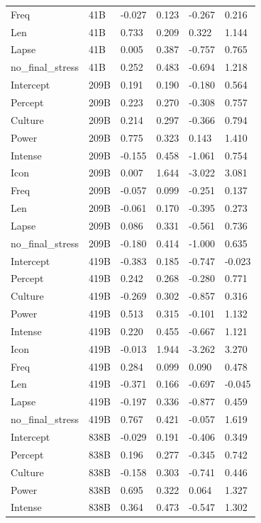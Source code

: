 \documentclass[
  nottoc]{article}
\begin{document}
\begin{longtable}[]{@{}llllll@{}}
Freq & 41B & -0.027 & 0.123 & -0.267 & 0.216 \\
Len & 41B & 0.733 & 0.209 & 0.322 & 1.144 \\
Lapse & 41B & 0.005 & 0.387 & -0.757 & 0.765 \\
no\_final\_stress & 41B & 0.252 & 0.483 & -0.694 & 1.218 \\
Intercept & 209B & 0.191 & 0.190 & -0.180 & 0.564 \\
Percept & 209B & 0.223 & 0.270 & -0.308 & 0.757 \\
Culture & 209B & 0.214 & 0.297 & -0.366 & 0.794 \\
Power & 209B & 0.775 & 0.323 & 0.143 & 1.410 \\
Intense & 209B & -0.155 & 0.458 & -1.061 & 0.754 \\
Icon & 209B & 0.007 & 1.644 & -3.022 & 3.081 \\
Freq & 209B & -0.057 & 0.099 & -0.251 & 0.137 \\
Len & 209B & -0.061 & 0.170 & -0.395 & 0.273 \\
Lapse & 209B & 0.086 & 0.331 & -0.561 & 0.736 \\
no\_final\_stress & 209B & -0.180 & 0.414 & -1.000 & 0.635 \\
Intercept & 419B & -0.383 & 0.185 & -0.747 & -0.023 \\
Percept & 419B & 0.242 & 0.268 & -0.280 & 0.771 \\
Culture & 419B & -0.269 & 0.302 & -0.857 & 0.316 \\
Power & 419B & 0.513 & 0.315 & -0.101 & 1.132 \\
Intense & 419B & 0.220 & 0.455 & -0.667 & 1.121 \\
Icon & 419B & -0.013 & 1.944 & -3.262 & 3.270 \\
Freq & 419B & 0.284 & 0.099 & 0.090 & 0.478 \\
Len & 419B & -0.371 & 0.166 & -0.697 & -0.045 \\
Lapse & 419B & -0.197 & 0.336 & -0.877 & 0.459 \\
no\_final\_stress & 419B & 0.767 & 0.421 & -0.057 & 1.619 \\
Intercept & 838B & -0.029 & 0.191 & -0.406 & 0.349 \\
Percept & 838B & 0.196 & 0.277 & -0.345 & 0.742 \\
Culture & 838B & -0.158 & 0.303 & -0.741 & 0.446 \\
Power & 838B & 0.695 & 0.322 & 0.064 & 1.327 \\
Intense & 838B & 0.364 & 0.473 & -0.547 & 1.302 \\

\end{longtable}
\end{document}
